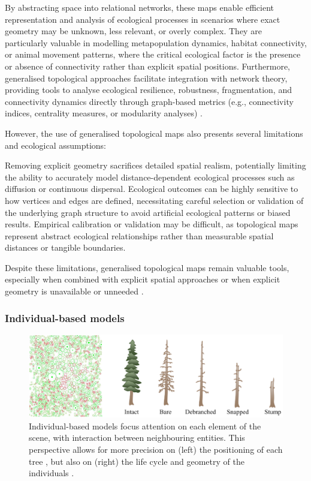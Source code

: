 By abstracting space into relational networks, these maps enable efficient representation and analysis of ecological processes in scenarios where exact geometry may be unknown, less relevant, or overly complex. They are particularly valuable in modelling metapopulation dynamics, habitat connectivity, or animal movement patterns, where the critical ecological factor is the presence or absence of connectivity rather than explicit spatial positions. Furthermore, generalised topological approaches facilitate integration with network theory, providing tools to analyse ecological resilience, robustness, fragmentation, and connectivity dynamics directly through graph-based metrics (e.g., connectivity indices, centrality measures, or modularity analyses) \cite{Lemiere2023,Gaucherel2012}.

However, the use of generalised topological maps also presents several limitations and ecological assumptions:
\begin{Itemize}
\Item{} Removing explicit geometry sacrifices detailed spatial realism, potentially limiting the ability to accurately model distance-dependent ecological processes such as diffusion or continuous dispersal.
\Item{} Ecological outcomes can be highly sensitive to how vertices and edges are defined, necessitating careful selection or validation of the underlying graph structure to avoid artificial ecological patterns or biased results.
\Item{} Empirical calibration or validation may be difficult, as topological maps represent abstract ecological relationships rather than measurable spatial distances or tangible boundaries.
\end{Itemize}

Despite these limitations, generalised topological maps remain valuable tools, especially when combined with explicit spatial approaches \cite{Ecormier-Nocca2021} or when explicit geometry is unavailable or unneeded \cite{Duflot2018,Boussange2022}.

\subsubsection{Individual-based models}

\begin{figure}
\includegraphics[]{individual-based-modeling-teaser.png}
\caption{Individual-based models focus attention on each element of the scene, with interaction between neighbouring entities. This perspective allows for more precision on (left) the positioning of each tree \cite{Alsweis2006}, but also on (right) the life cycle and geometry of the individuals \cite{Peytavie2024a}.}
\label{fig:env-obj-individual-based-models}
\end{figure}

